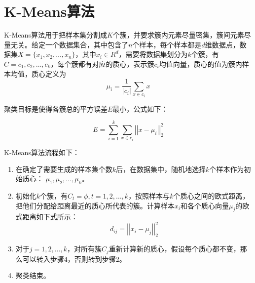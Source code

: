 \section{K-Means算法}

K-Means算法\cite{K_Means_1979}用于把样本集分割成${K}$个簇，并要求簇内元素尽量密集，簇间元素尽量无关。给定一个数据集合，其中包含了${n}$个样本，每个样本都是${d}$维数据点，数据集${X=\{x_1,x_2,\ldots,x_n\}}$，其中${x_i \in R^d}$，需要将数据集划分为${k}$个簇，有${C=c_1, c_2, \ldots, c_k}$，每个簇都有对应的质心，表示簇${c_i}$均值向量，质心的值为簇内样本均值，质心定义为
\begin{equation}
	\mu_i=\frac{1}{\left|c_i\right|}\sum_{x\in c_i} x
\end{equation}

聚类目标是使得各簇总的平方误差${E}$最小，公式如下：

\begin{equation}
	E=\sum_{i=1}^{k}\sum_{x\in c_i}\left|\left|x-\mu_i\right|\right|_2^2
\end{equation}



K-Means算法流程如下：
\begin{enumerate}
	\item 在确定了需要生成的样本集个数${k}$后，在数据集中，随机地选择${k}$个样本作为初始质心： ${{\mu_1,\mu_2,\ldots,\mu_k}}$。%
	\item 初始化${k}$个簇，有${C_t=\phi,t=1,2,\ldots,k}$，按照样本与${k}$个质心之间的欧式距离，把他们分配给距离最近的质心所代表的簇。计算样本${x_i}$和各个质心向量${\mu_j}$的欧式距离如下式所示：
	\begin{equation}
		d_{ij}=\left|\left|x_i-\mu_j\right|\right|_2^2
	\end{equation}
	
	\item 对于${j=1,2,...,k}$，对所有簇${C_j}$重新计算新的质心，假设每个质心都不变，那么可以转入步骤4，否则转到步骤2。
	\item 聚类结束。
\end{enumerate}


